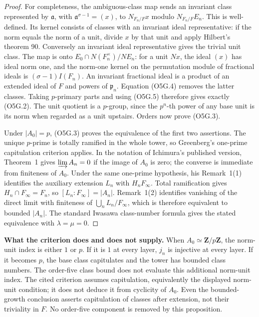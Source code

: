 \documentclass[11pt,a4paper]{article}
\theoremstyle{definition}
\renewcommand{\paragraph}[1]{\par\smallskip\noindent\textbf{#1}\quad\ignorespaces}
\begin{document}
\begin{proof}
For completeness, the ambiguous-class map sends an invariant
class represented by $\mathfrak a$, with
$\mathfrak a^{\sigma-1}=(x)$, to $N_{F_n/F}x$ modulo
$N_{F_n/F}E_n$.  This is well-defined.  Its kernel consists
of classes with an invariant ideal representative: if the
norm equals the norm of a unit, divide $x$ by that unit and
apply Hilbert's theorem 90.  Conversely an invariant ideal
representative gives the trivial unit class.
The map is onto $E_0\cap N(F_n^{\times})/N E_n$:
for a unit $N x$, the ideal $(x)$ has ideal norm one, and the
norm-one kernel on the permutation module of fractional ideals
is $(\sigma-1)I(F_n)$.
An invariant fractional ideal is a product of an extended ideal
of $F$ and powers of $\mathfrak p_n$.  Equation (O5G.4) removes
the latter classes.  Taking $p$-primary parts and using (O5G.5)
therefore gives exactly (O5G.2).  The unit quotient is a
$p$-group, since the $p^n$-th power of any base unit is its norm
when regarded as a unit upstairs.  Orders now prove (O5G.3).

Under $|A_0|=p$, (O5G.3) proves the equivalence of the first
two assertions.  The unique $p$-prime is totally ramified in
the whole tower, so Greenberg's one-prime capitulation criterion
applies.  In the notation of Ichimura's published version,
Theorem~1 gives $\varinjlim A_n=0$ if the image of $A_0$ is zero;
the converse is immediate from finiteness of $A_0$.
Under the same one-prime hypothesis, his Remark~1(1) identifies
the auxiliary extension $L_n$ with $H_nF_\infty$.
Total ramification gives $H_n\cap F_\infty=F_n$, so
$[L_n:F_\infty]=|A_n|$.  Remark~1(2) identifies vanishing of
the direct limit with finiteness of $\bigcup_nL_n/F_\infty$,
which is therefore equivalent to bounded $|A_n|$.
The standard Iwasawa class-number formula gives the stated
equivalence with $\lambda=\mu=0$.
\end{proof}

\paragraph{What the criterion does and does not supply.}
When $A_0\simeq\mathbf Z/p\mathbf Z$, the norm-unit index is
either $1$ or $p$.  If it is $1$ at every layer, $j_n$ is
injective at every layer.  If it becomes $p$, the base class
capitulates and the tower has bounded class numbers.
The order-five class bound does not evaluate this additional
norm-unit index.  The cited criterion assumes capitulation,
equivalently the displayed norm-unit condition; it does not
deduce it from cyclicity of $A_0$.
Even the bounded-growth conclusion asserts capitulation of
classes after extension, not their triviality in $F$.
No order-five component is removed by this proposition.
\end{document}
